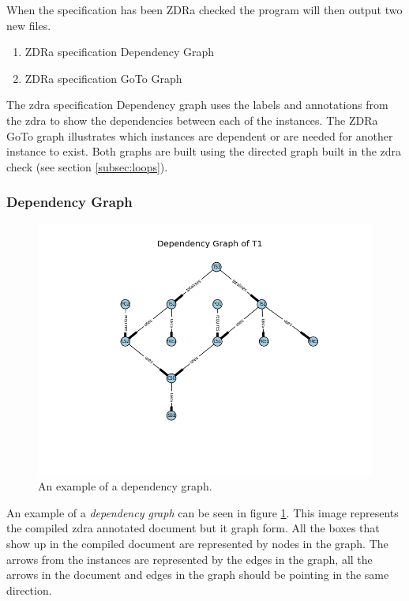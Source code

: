 When the specification has been ZDRa checked the program will then output two new files.
\begin{enumerate}

\item ZDRa specification Dependency Graph

\item ZDRa specification GoTo Graph
\end{enumerate}

The \gls{zdra} specification Dependency graph uses the labels and annotations from the \gls{zdra} to show the dependencies between each of the instances. The ZDRa GoTo graph illustrates which instances are dependent or are needed for another instance to exist. Both graphs are built using the directed graph built in the \gls{zdra} check (see section \ref{subsec:loops}).

\subsubsection{Dependency Graph}

\begin{figure}[H]
\centering
\includegraphics[scale=0.5]{Figures/zdra/depgraph.png}
\caption{An example of a dependency graph. \label{fig:depgraph}}
\end{figure}

An example of a \emph{dependency graph} can be seen in figure \ref{fig:depgraph}. This image represents the compiled \gls{zdra} annotated document but it graph form. All the boxes that show up in the compiled document are represented by nodes in the graph. The arrows from the instances are represented by the edges in the graph, all the arrows in the document and edges in the graph should be pointing in the same direction.


